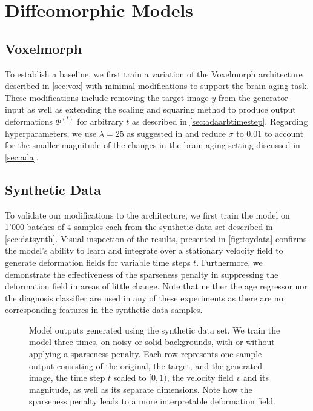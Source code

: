 \section{Diffeomorphic Models}

\subsection{Voxelmorph}
To establish a baseline, we first train a variation of the Voxelmorph architecture described in \autoref{sec:vox} with minimal modifications to support the brain aging task. These modifications include removing the target image $y$ from the generator input as well as extending the scaling and squaring method to produce output deformations $\Phi^{(t)}$ for arbitrary $t$ as described in \autoref{sec:adaarbtimestep}. Regarding hyperparameters, we use $\lambda = 25$ as suggested in \cite{dalca2018unsupervised} and reduce $\sigma$ to $0.01$ to account for the smaller magnitude of the changes in the brain aging setting discussed in \autoref{sec:ada}.

\subsection{Synthetic Data}
To validate our modifications to the architecture, we first train the model on 1'000 batches of 4 samples each from the synthetic data set described in \autoref{sec:datsynth}. Visual inspection of the results, presented in \autoref{fig:toydata} confirms the model's ability to learn and integrate over a stationary velocity field to generate deformation fields for variable time steps $t$. Furthermore, we demonstrate the effectiveness of the sparseness penalty in suppressing the deformation field in areas of little change. Note that neither the age regressor nor the diagnosis classifier are used in any of these experiments as there are no corresponding features in the synthetic data samples.

\begin{figure}
	\centering
	
	\vspace*{-15pt}
	\caption{Model outputs generated using the synthetic data set. We train the model three times, on noisy or solid backgrounds, with or without applying a sparseness penalty. Each row represents one sample output consisting of the original, the target, and the generated image, the time step $t$ scaled to $[0, 1)$, the velocity field $v$ and its magnitude, as well as its separate dimensions. Note how the sparseness penalty leads to a more interpretable deformation field.}
	\label{fig:toydata}
\end{figure}

